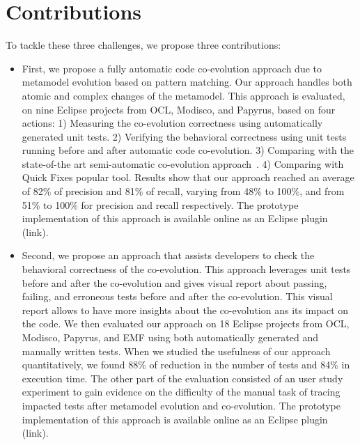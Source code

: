 \section{Contributions}
To tackle these three challenges, we propose three contributions:
\begin{itemize}[label=]

	\item First, we propose a fully automatic code co-evolution approach due to metamodel evolution based on pattern matching. Our approach handles both atomic and complex changes of the metamodel. This approach is evaluated, on nine Eclipse projects from OCL, Modisco, and Papyrus, based on four actions: 1) Measuring the co-evolution correctness using automatically generated unit tests. 2) Verifying the behavioral correctness using unit tests running before and after automatic code co-evolution. 3) Comparing with the state-of-the art semi-automatic co-evolution approach~\cite{Khelladi2020}. 4) Comparing with Quick Fixes popular tool. Results show that our approach reached an average of 82\% of precision and 81\% of recall, varying from 48\% to 100\%, and from 51\% to 100\% for precision and recall respectively. The prototype implementation of this approach is available online as an Eclipse plugin (link).
	
	
	\item Second, we propose an approach that assists developers to check the behavioral correctness of the co-evolution. This approach leverages unit tests before and after the co-evolution and gives visual report about passing, failing, and erroneous tests before and after the co-evolution. This visual report allows to have more insights about the co-evolution ans its impact on the code. We then evaluated our approach on 18 Eclipse projects from
	OCL, Modisco, Papyrus, and EMF using both automatically generated and manually written tests. When we studied the usefulness of our approach quantitatively, we found 88\% of reduction in the number of tests and 84\% in execution time. The other part of the evaluation consisted of an user study experiment to gain evidence on the difficulty of the manual task of tracing impacted tests after metamodel
	evolution and co-evolution. The prototype implementation of this approach is available online as an Eclipse plugin (link).
	

\end{itemize}
